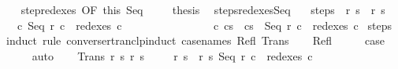 \begin{isabellebody}
\isanewline
\ \ \isamarkupfalse%
\ step{\isacharunderscore}redexes\ {\isacharbrackleft}OF\ this\ Seq{\isacharbrackright}\ \isanewline
\ \ \isamarkupfalse%
\ {\isacharquery}thesis\ \isacommand{{\isachardot}}\isamarkupfalse%
\isanewline
{}\isamarkupfalse%
%
\endisatagproof
{\isafoldproof}%
%
\isadelimproof
\isanewline
%
\endisadelimproof
\isanewline
{}\isamarkupfalse%
\ steps{\isacharunderscore}redexes{\isacharunderscore}Seq{\isacharcolon}\isanewline
\ \ \ steps{\isacharcolon}\ {\isachardoublequoteopen}{\isasymGamma}{\isasymturnstile}\ {\isacharparenleft}r{\isacharcomma}\ s{\isacharparenright}\ {\isasymrightarrow}\isactrlsup {\isacharasterisk}\ {\isacharparenleft}r{\isacharprime}{\isacharcomma}\ s{\isacharprime}{\isacharparenright}{\isachardoublequoteclose}\isanewline
\ \ \ {\isachardoublequoteopen}{\isasymAnd}c{\isachardot}\ Seq\ r\ c\ {\isasymin}\ redexes\ c\ {\isasymLongrightarrow}\ \isanewline
\ \ \ \ \ \ \ \ \ \ \ \ \ \ {\isasymexists}c{\isacharprime}{\isachardot}\ {\isasymGamma}{\isasymturnstile}{\isacharparenleft}c{\isacharcomma}s{\isacharparenright}\ {\isasymrightarrow}\isactrlsup {\isacharasterisk}\ {\isacharparenleft}c{\isacharprime}{\isacharcomma}s{\isacharprime}{\isacharparenright}\ {\isasymand}\ Seq\ r{\isacharprime}\ c\ {\isasymin}\ redexes\ c{\isacharprime}{\isachardoublequoteclose}\isanewline
%
\isadelimproof
%
\endisadelimproof
%
\isatagproof
{}\isamarkupfalse%
\ steps\ \isanewline
{}\isamarkupfalse%
\ {\isacharparenleft}induct\ rule{\isacharcolon}\ converse{\isacharunderscore}rtranclp{\isacharunderscore}induct{}\ {\isacharbrackleft}case{\isacharunderscore}names\ Refl\ Trans{\isacharbrackright}{\isacharparenright}\isanewline
\ \ \isamarkupfalse%
\ Refl\isanewline
\ \ \isamarkupfalse%
\ \isamarkupfalse%
\ {\isacharquery}case\isanewline
\ \ \ \ \isamarkupfalse%
\ {\isacharparenleft}auto{\isacharparenright}\isanewline
\isanewline
{}\isamarkupfalse%
\isanewline
\ \ \isamarkupfalse%
\ {\isacharparenleft}Trans\ r\ s\ r{\isacharprime}{\isacharprime}\ s{\isacharprime}{\isacharprime}{\isacharparenright}\isanewline
\ \ \isamarkupfalse%
\ {\isachardoublequoteopen}{\isasymGamma}{\isasymturnstile}\ {\isacharparenleft}r{\isacharcomma}\ s{\isacharparenright}\ {\isasymrightarrow}\ {\isacharparenleft}r{\isacharprime}{\isacharprime}{\isacharcomma}\ s{\isacharprime}{\isacharprime}{\isacharparenright}{\isachardoublequoteclose}\ {\isachardoublequoteopen}Seq\ r\ c\ {\isasymin}\ redexes\ c{\isachardoublequoteclose}\ \isamarkupfalse%

\end{isabellebody}

